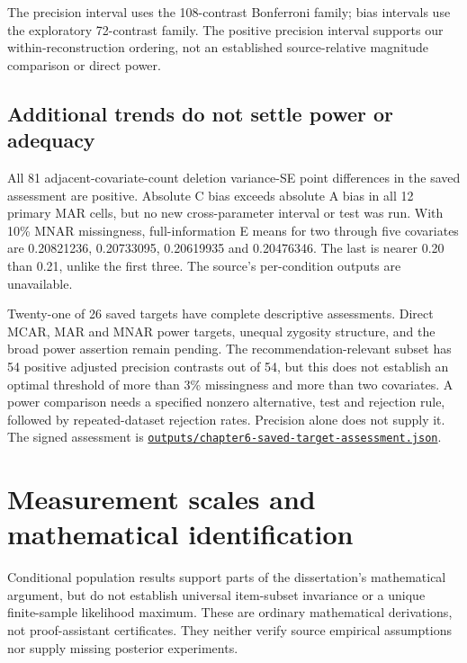 \documentclass[11pt]{article}
\newcommand{\file}[1]{\href{https://github.com/alectionary/vibe-math/blob/master/formalization/schwabe-psychometric-genetics/#1}{\nolinkurl{#1}}}
\begin{document}
The precision interval uses the 108-contrast Bonferroni family; bias intervals use the exploratory 72-contrast family. The positive precision interval supports our within-reconstruction ordering, not an established source-relative magnitude comparison or direct power.

\subsection{Additional trends do not settle power or adequacy}
All 81 adjacent-covariate-count deletion variance-SE point differences in the saved assessment are positive. Absolute C bias exceeds absolute A bias in all 12 primary MAR cells, but no new cross-parameter interval or test was run. With 10\% MNAR missingness, full-information E means for two through five covariates are 0.20821236, 0.20733095, 0.20619935 and 0.20476346. The last is nearer 0.20 than 0.21, unlike the first three. The source's per-condition outputs are unavailable.

Twenty-one of 26 saved targets have complete descriptive assessments. Direct MCAR, MAR and MNAR power targets, unequal zygosity structure, and the broad power assertion remain pending. The recommendation-relevant subset has 54 positive adjusted precision contrasts out of 54, but this does not establish an optimal threshold of more than 3\% missingness and more than two covariates. A power comparison needs a specified nonzero alternative, test and rejection rule, followed by repeated-dataset rejection rates. Precision alone does not supply it. The signed assessment is \file{outputs/chapter6-saved-target-assessment.json}.

\section{Measurement scales and mathematical identification}\label{sec:theory}
Conditional population results support parts of the dissertation's mathematical argument, but do not establish universal item-subset invariance or a unique finite-sample likelihood maximum. These are ordinary mathematical derivations, not proof-assistant certificates. They neither verify source empirical assumptions nor supply missing posterior experiments.
\end{document}
